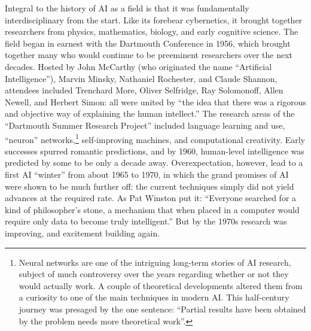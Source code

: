 Integral to the history of AI as a field is that it was fundamentally
interdisciplinary from the start. Like its forebear cybernetics, it
brought together researchers from physics, mathematics, biology, and
early cognitive science. The field began in earnest with the Dartmouth
Conference in 1956, which brought together many who would continue to
be preeminent researchers over the next decades. Hosted by John
McCarthy (who originated the name
``Artificial Intelligence''), Marvin Minsky, Nathaniel Rochester, and
Claude Shannon, attendees included Trenchard More, Oliver Selfridge,
Ray Solomonoff, Allen Newell, and Herbert Simon: all were united by
``the idea that there was a rigorous and objective way of explaining
the human intellect.''\cite[Ch. 5]{mccorduck} The research areas of
the ``Dartmouth Summer Research Project'' included language learning
and use, ``neuron'' networks,\footnote{Neural networks are one of the
  intriguing long-term stories of AI research, subject of much
  controversy over the years regarding whether or not they would
  actually work. A couple of theoretical developments altered them
  from a curiosity to one of the main techniques in modern AI. This
  half-century journey was presaged by the one sentence: ``Partial
  results have been obtained by the problem needs more theoretical
  work''.\cite{dartmouthconf}} self-improving machines, and computational 
creativity.\cite{dartmouthconf} Early successes spurred romantic
predictions, and by 1960, human-level intelligence was predicted by
some to be only a decade away.\cite[p. 3]{winston} Overexpectation, however,
lead to a first AI ``winter'' from about 1965 to 1970, in which the
grand promises of AI were shown to be much further off: the current
techniques simply did not yield advances at the required rate. As Pat
Winston put it: ``Everyone searched for a kind of philosopher's stone,
a mechanism that when placed in a computer would require only data to
become truly intelligent.''\cite[p. 4]{winston} But by the 1970s
research was improving, and excitement building again.


